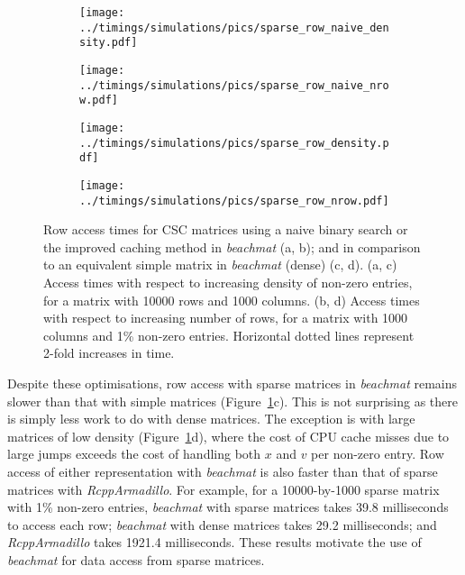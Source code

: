 \documentclass[10pt,letterpaper]{article}
\newcommand{\beachmat}{\textit{beachmat}}
\begin{document}

\begin{figure}[btp]
    \begin{subfigure}[b]{0.49\textwidth}
        \texttt{[image: ../timings/simulations/pics/sparse\_row\_naive\_density.pdf]}
        \caption{}
    \end{subfigure}
    \begin{subfigure}[b]{0.49\textwidth}
        \texttt{[image: ../timings/simulations/pics/sparse\_row\_naive\_nrow.pdf]}
        \caption{}
    \end{subfigure}
    \begin{subfigure}[b]{0.49\textwidth}
        \texttt{[image: ../timings/simulations/pics/sparse\_row\_density.pdf]}
        \caption{}
    \end{subfigure}
    \begin{subfigure}[b]{0.49\textwidth}
        \texttt{[image: ../timings/simulations/pics/sparse\_row\_nrow.pdf]}
        \caption{}
    \end{subfigure}
    \caption{Row access times for CSC matrices using a naive binary search or the improved caching method in \beachmat{} (a, b); and in comparison to an equivalent simple matrix in \beachmat{} (dense) (c, d).
        (a, c) Access times with respect to increasing density of non-zero entries, for a matrix with 10000 rows and 1000 columns.
        (b, d) Access times with respect to increasing number of rows, for a matrix with 1000 columns and 1\% non-zero entries.
        Horizontal dotted lines represent 2-fold increases in time.
    }
    \label{fig:sparserow}
\end{figure}


Despite these optimisations, row access with sparse matrices in \beachmat{} remains slower than that with simple matrices (Figure~\ref{fig:sparserow}c).
This is not surprising as there is simply less work to do with dense matrices.
The exception is with large matrices of low density (Figure~\ref{fig:sparserow}d), where the cost of CPU cache misses due to large jumps exceeds the cost of handling both $x$ and $v$ per non-zero entry.
Row access of either representation with \beachmat{} is also faster than that of sparse matrices with \textit{RcppArmadillo}.
For example, for a 10000-by-1000 sparse matrix with 1\% non-zero entries, \beachmat{} with sparse matrices takes 39.8 milliseconds to access each row; \beachmat{} with dense matrices takes 29.2 milliseconds; and \textit{RcppArmadillo} takes 1921.4 milliseconds.
These results motivate the use of \beachmat{} for data access from sparse matrices.
\end{document}
